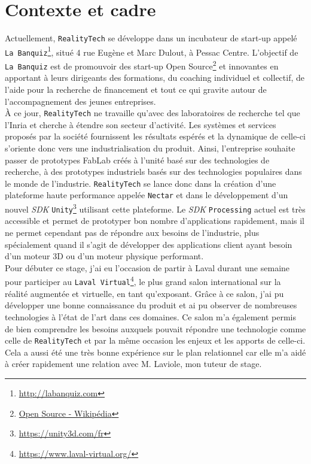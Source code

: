 \section{Contexte et cadre}
\label{sec:contexte}
Actuellement, \texttt{RealityTech} se développe dans un incubateur de start-up appelé \texttt{La Banquiz}\footnote{\href{http://labanquiz.com}{http://labanquiz.com}}, situé 4 rue Eugène et Marc Dulout, à Pessac Centre. L'objectif de \texttt{La Banquiz} est de promouvoir des start-up Open Source\footnote{\href{https://fr.wikipedia.org/wiki/Open\_source}{Open Source - Wikipédia}} et innovantes en apportant à leurs dirigeants des formations, du coaching individuel et collectif, de l'aide pour la recherche de financement et tout ce qui gravite autour de l'accompagnement des jeunes entreprises.\\

À ce jour, \texttt{RealityTech} ne travaille qu'avec des laboratoires de recherche tel que l'Inria et cherche à étendre son secteur d'activité. Les systèmes et services proposés par la société fournissent les résultats espérés et la dynamique de celle-ci s'oriente donc vers une industrialisation du produit. Ainsi, l'entreprise souhaite passer de prototypes FabLab créés à l'unité basé sur des technologies de recherche, à des prototypes industriels basés sur des technologies populaires dans le monde de l'industrie. \texttt{RealityTech} se lance donc dans la création d'une plateforme haute performance appelée \texttt{Nectar} et dans le développement d'un nouvel \emph{SDK} \texttt{Unity}\footnote{\href{https://unity3d.com/fr}{https://unity3d.com/fr}} utilisant cette plateforme. Le \emph{SDK} \texttt{Processing} actuel est très accessible et permet de prototyper bon nombre d'applications rapidement, mais il ne permet cependant pas de répondre aux besoins de l'industrie, plus spécialement quand il s'agit de développer des applications client ayant besoin d'un moteur 3D ou d'un moteur physique performant.\\

Pour débuter ce stage, j'ai eu l'occasion de partir à Laval durant une semaine pour participer au \texttt{Laval Virtual}\footnote{\href{https://www.laval-virtual.org/}{https://www.laval-virtual.org/}}, le plus grand salon international sur la réalité augmentée et virtuelle, en tant qu'exposant. Grâce à ce salon, j'ai pu développer une bonne connaissance du produit et ai pu observer de nombreuses technologies à l'état de l'art dans ces domaines. Ce salon m'a également permis de bien comprendre les besoins auxquels pouvait répondre une technologie comme celle de \texttt{RealityTech} et par la même occasion les enjeux et les apports de celle-ci. Cela a aussi été une très bonne expérience sur le plan relationnel car elle m'a aidé à créer rapidement une relation avec M. Laviole, mon tuteur de stage.

